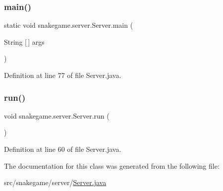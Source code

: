 \subsubsection{\texorpdfstring{main()}{main()}}
{\footnotesize\ttfamily static void snakegame.\+server.\+Server.\+main (\begin{DoxyParamCaption}\item[{String \mbox{[}$\,$\mbox{]}}]{args }\end{DoxyParamCaption})\hspace{0.3cm}{\ttfamily [static]}}



Definition at line 77 of file Server.\+java.

\mbox{\label{classsnakegame_1_1server_1_1_server_af0101ad4e19f7ffc7ac541af737b5339}} 
\subsubsection{\texorpdfstring{run()}{run()}}
{\footnotesize\ttfamily void snakegame.\+server.\+Server.\+run (\begin{DoxyParamCaption}{ }\end{DoxyParamCaption})}



Definition at line 60 of file Server.\+java.



The documentation for this class was generated from the following file\+:\begin{DoxyCompactItemize}
\item 
src/snakegame/server/\mbox{\hyperlink{_server_8java}{Server.\+java}}\end{DoxyCompactItemize}
